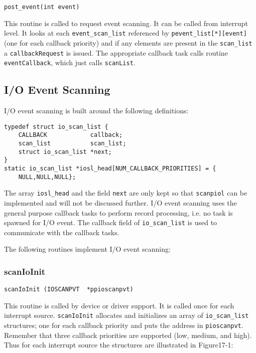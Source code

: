 \begin{verbatim}
post_event(int event)
\end{verbatim}

This routine is called to request  event scanning. It can be called from interrupt level. It looks at each 
\verb|event_scan_list| referenced by \verb|pevent_list[*][event]| (one for each callback priority) and if any elements are 
present in the \verb|scan_list| a \verb|callbackRequest| is issued. The appropriate callback task calls routine 
\verb|eventCallback|, which just calls \verb|scanList|. 

\subsection{I/O Event Scanning}

I/O event scanning is built around the following definitions:

\begin{verbatim}
typedef struct io_scan_list {
    CALLBACK            callback;
    scan_list           scan_list;
    struct io_scan_list *next;
}
static io_scan_list *iosl_head[NUM_CALLBACK_PRIORITIES] = {
    NULL,NULL,NULL};
\end{verbatim}

The array \verb|iosl_head| and the field \verb|next| are only kept so that \verb|scanpiol| can be implemented and will not be discussed 
further. I/O event scanning uses the general purpose callback tasks to perform record processing, i.e. no task is spawned 
for I/O event. The callback field of \verb|io_scan_list| is used to communicate with the callback tasks.

The following routines implement I/O event scanning:

\subsubsection{scanIoInit}

\begin{verbatim}
scanIoInit (IOSCANPVT  *ppioscanpvt)
\end{verbatim}

This routine is called by device or driver support. It is called once for each interrupt source. \verb|scanIoInit| allocates and 
initializes an array of \verb|io_scan_list| structures; one for each callback priority and puts the address in \verb|pioscanpvt|. 
Remember that three callback priorities are supported (low, medium, and high). Thus for each interrupt source the 
structures are illustrated in Figure17-1:

